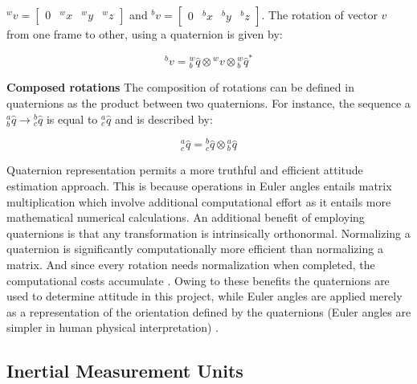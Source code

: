 $ ^wv = \begin{bmatrix}
        0 & ^wx & ^wy & ^wz
    \end{bmatrix} $
and
$^bv = \begin{bmatrix}
        0 & ^bx & ^by & ^bz
    \end{bmatrix} $. The rotation of vector $v$ from one frame to other, using a quaternion is given by:

\begin{equation}
    \textrm{$^{b}v$} = \textrm{$_{b}^{w}\hat{q}$} \otimes \textrm{$^{w}v$} \otimes \textrm{$_{b}^{w}\hat{q}$}^*
\end{equation}

\item \textbf{Composed rotations} The composition of rotations can be defined in quaternions as the product between two quaternions. For instance, the sequence a $^a_b\hat{q} \rightarrow {^b_c\hat{q}}$ is equal to $^a_c{\hat{q}}$ and is described by:

\begin{equation}
    \textrm{$_{c}^{a}\hat{q}$} = \textrm{$_{c}^{b}\hat{q}$} \otimes \textrm{$_{b}^{a}\hat{q}$}
\end{equation}

Quaternion representation permits a more truthful and efficient attitude estimation approach. This is because operations in Euler angles entails matrix multiplication which involve additional computational effort as it entails more mathematical numerical calculations. An additional benefit of employing quaternions is that any transformation is intrinsically orthonormal. Normalizing a quaternion is significantly computationally more efficient than normalizing a matrix. And since every rotation needs normalization when completed, the computational costs accumulate \cite{funda1990homogeneous}. Owing to these benefits the quaternions are used to determine attitude in this project, while Euler angles are applied merely as a representation of the orientation defined by the quaternions (Euler angles are simpler in human physical interpretation) \cite{toso2015esa}.

\subsection{Inertial Measurement Units}


